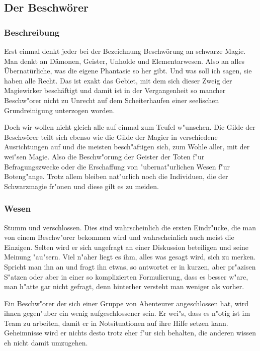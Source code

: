 \subsection{Der Beschwörer}
\subsubsection{Beschreibung}
\par Erst einmal denkt jeder bei der Bezeichnung \glqq Beschwörung\grqq{}
an schwarze Magie. Man denkt an Dämonen,
Geister, Unholde und
Elementarwesen. Also an alles
Übernatürliche, was die eigene Phantasie so her gibt.
Und was soll ich sagen, sie haben alle Recht. Das ist exakt das
Gebiet, mit dem sich dieser Zweig der Magiewirker beschäftigt und
damit ist in der Vergangenheit so mancher Beschw"orer nicht zu
Unrecht auf dem Scheiterhaufen einer seelischen Grundreinigung
unterzogen worden.
\par Doch wir wollen nicht gleich alle auf einmal zum Teufel w"unschen.
Die Gilde der Beschwörer teilt sich ebenso wie die Gilde der Magier
in verschiedene Ausrichtungen auf und die meisten besch"aftigen sich,
zum Wohle aller, mit der wei"sen Magie. Also die Beschw"orung der
Geister der Toten f"ur Befragungszwecke oder die Erschaffung von
"ubernat"urlichen Wesen f"ur Boteng"ange. Trotz allem bleiben
nat"urlich noch die Individuen, die der Schwarzmagie fr"onen und
diese gilt es zu meiden.
\subsubsection{Wesen}
\par Stumm und verschlossen. Dies sind wahrscheinlich die ersten
Eindr"ucke, die man von einem Beschw"orer bekommen wird und
wahrscheinlich auch meist die Einzigen. Selten wird er sich
ungefragt an einer Diskussion beteiligen und seine Meinung "au"sern.
Viel n"aher liegt es ihm, alles was gesagt wird, sich zu merken.
Spricht man ihn an und fragt ihn etwas, so antwortet er in kurzen,
aber pr"azisen S"atzen oder aber in einer so komplizierten
Formulierung, dass es besser w"are, man h"atte gar nicht gefragt,
denn hinterher versteht man weniger als vorher.
\par Ein Beschw"orer der sich einer Gruppe von Abenteurer
angeschlossen hat, wird ihnen gegen"uber ein wenig aufgeschlossener
sein. Er wei"s, dass es n"otig ist im Team zu arbeiten, damit er in
Notsituationen auf ihre Hilfe setzen kann. Geheimnisse wird er
nichts desto trotz eher f"ur sich behalten, die anderen wissen eh
nicht damit umzugehen.

